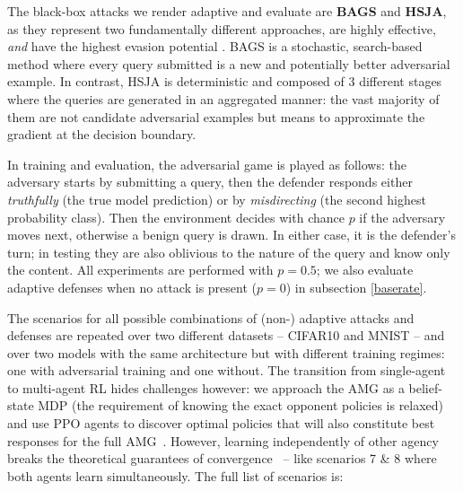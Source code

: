 The black-box attacks we render adaptive and evaluate are \textbf{BAGS} and \textbf{HSJA}, as they represent two fundamentally different approaches, are highly effective, \emph{and} have the highest evasion potential \cite{li2022blacklight}.
BAGS is a stochastic, search-based method where every query submitted is a new and potentially better adversarial example.
In contrast, HSJA is deterministic and composed of 3 different stages where the queries are generated in an aggregated manner: the vast majority of them are not candidate adversarial examples but means to approximate the gradient at the decision boundary.

In training and evaluation, the adversarial game is played as follows: the adversary starts by submitting a query, then the defender responds either \emph{truthfully} (the true model prediction) or by \emph{misdirecting} (the second highest probability class).
Then the environment decides with chance $p$ if the adversary moves next, otherwise a benign query is drawn.
In either case, it is the defender's turn; in testing they are also oblivious to the nature of the query and know only the content.
All experiments are performed with $p=0.5$; we also evaluate adaptive defenses when no attack is present ($p=0$) in subsection \ref{baserate}.

The scenarios for all possible combinations of (non-) adaptive attacks and defenses are repeated over two different datasets -- CIFAR10 and MNIST -- and over two models with the same architecture but with different training regimes: one with adversarial training and one without.
The transition from single-agent to multi-agent \gls{RL} hides challenges however: we approach the AMG as a belief-state MDP (the requirement of knowing the exact opponent policies is relaxed) and use PPO \cite{schulman2017proximal} agents to discover optimal policies that will also constitute best responses for the full AMG~\cite{wen2019probabilistic}.
However, learning independently of other agency breaks the theoretical guarantees of convergence~\cite{tuyls2012multiagent} -- like scenarios 7 \& 8 where both agents learn simultaneously.
The full list of scenarios is:

